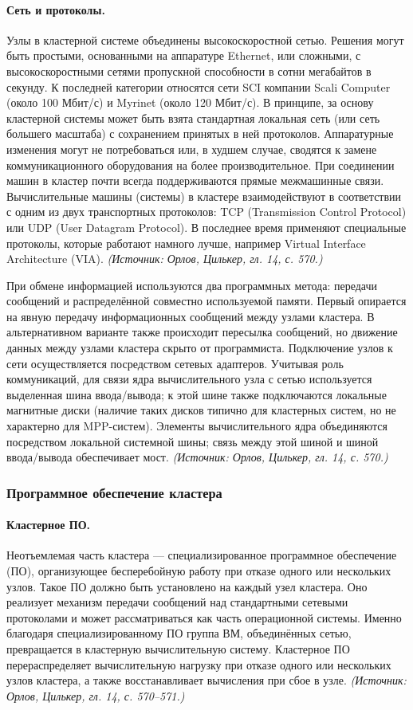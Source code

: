 \documentclass[a4paper,12pt]{article}
\begin{document}
\paragraph{Сеть и протоколы.}
Узлы в кластерной системе объединены высокоскоростной сетью. Решения могут быть простыми, основанными на аппаратуре Ethernet, или сложными, с высокоскоростными сетями пропускной способности в сотни мегабайтов в секунду. К последней категории относятся сети SCI компании Scali Computer (около 100 Мбит/с) и Myrinet (около 120 Мбит/с). В принципе, за основу кластерной системы может быть взята стандартная локальная сеть (или сеть большего масштаба) с сохранением принятых в ней протоколов. Аппаратурные изменения могут не потребоваться или, в худшем случае, сводятся к замене коммуникационного оборудования на более производительное. При соединении машин в кластер почти всегда поддерживаются прямые межмашинные связи. Вычислительные машины (системы) в кластере взаимодействуют в соответствии с одним из двух транспортных протоколов: TCP (Transmission Control Protocol) или UDP (User Datagram Protocol). В последнее время применяют специальные протоколы, которые работают намного лучше, например Virtual Interface Architecture (VIA).
\textit{(Источник: Орлов, Цилькер, гл. 14, с. 570.)}

При обмене информацией используются два программных метода: передачи сообщений и распределённой совместно используемой памяти. Первый опирается на явную передачу информационных сообщений между узлами кластера. В альтернативном варианте также происходит пересылка сообщений, но движение данных между узлами кластера скрыто от программиста. Подключение узлов к сети осуществляется посредством сетевых адаптеров. Учитывая роль коммуникаций, для связи ядра вычислительного узла с сетью используется выделенная шина ввода/вывода; к этой шине также подключаются локальные магнитные диски (наличие таких дисков типично для кластерных систем, но не характерно для MPP-систем). Элементы вычислительного ядра объединяются посредством локальной системной шины; связь между этой шиной и шиной ввода/вывода обеспечивает мост.
\textit{(Источник: Орлов, Цилькер, гл. 14, с. 570.)}

\subsubsection{Программное обеспечение кластера}

\paragraph{Кластерное ПО.}
Неотъемлемая часть кластера — специализированное программное обеспечение (ПО), организующее бесперебойную работу при отказе одного или нескольких узлов. Такое ПО должно быть установлено на каждый узел кластера. Оно реализует механизм передачи сообщений над стандартными сетевыми протоколами и может рассматриваться как часть операционной системы. Именно благодаря специализированному ПО группа ВМ, объединённых сетью, превращается в кластерную вычислительную систему. Кластерное ПО перераспределяет вычислительную нагрузку при отказе одного или нескольких узлов кластера, а также восстанавливает вычисления при сбое в узле.
\textit{(Источник: Орлов, Цилькер, гл. 14, с. 570--571.)}
\end{document}
